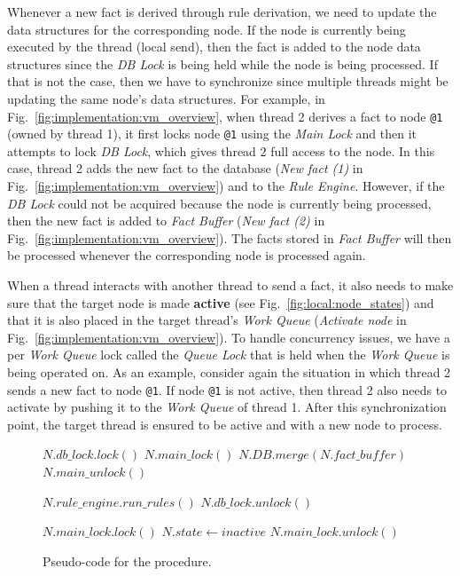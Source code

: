Whenever a new fact is derived through rule derivation, we need to update the
data structures for the corresponding node. If the node is currently being
executed by the thread (local send), then the fact is added to the node data
structures since the \emph{DB Lock} is being held while the node is being
processed. If that is not the case, then we have to synchronize since multiple
threads might be updating the same node's data structures. For example, in
Fig.~\ref{fig:implementation:vm_overview}, when thread 2 derives a fact to node
\texttt{@1} (owned by thread 1), it first locks node \texttt{@1} using the
\emph{Main Lock} and then it attempts to lock \emph{DB Lock}, which gives thread
2 full access to the node. In this case, thread 2 adds the new fact to the
database (\emph{New fact (1)} in Fig.~\ref{fig:implementation:vm_overview}) and
to the \emph{Rule Engine}. However, if the \emph{DB Lock} could not be acquired
because the node  is currently being processed, then the new fact is
added to \emph{Fact Buffer} (\emph{New fact (2)} in
Fig.~\ref{fig:implementation:vm_overview}). The facts stored in \emph{Fact
Buffer} will then be processed whenever the corresponding node is processed
again.

When a thread interacts with another thread to send a fact, it also needs to
make sure that the target node is made \textbf{active} (see
Fig.~\ref{fig:local:node_states}) and that it is also placed in the target
thread's \emph{Work Queue} (\emph{Activate node} in
Fig.~\ref{fig:implementation:vm_overview}). To handle concurrency issues, we
have a per \emph{Work Queue} lock called the \emph{Queue Lock} that is held when
the \emph{Work Queue} is being operated on.  As an example, consider again the
situation in which thread 2 sends a new fact to node \texttt{@1}. If node
\texttt{@1} is not active, then thread 2 also needs to activate  by
pushing it to the \emph{Work Queue} of thread 1.  After this synchronization
point, the target thread is ensured to be active and with a new node to process.

\begin{figure}
\begin{algorithm}[H]
   $N.db\_lock.lock()$\;
   $N.main\_lock()$\;
   $N.DB.merge(N.fact\_buffer)$\;
   $N.main\_unlock()$\;

   $N.rule\_engine.run\_rules()$\;
   $N.db\_lock.unlock()$\;

   $N.main\_lock.lock()$\;
   $N.state \longleftarrow inactive$\;
   $N.main\_lock.unlock()$\;
\end{algorithm}
\caption{Pseudo-code for the  procedure.}
 \label{alg:multicore:process_node}
\end{figure}
